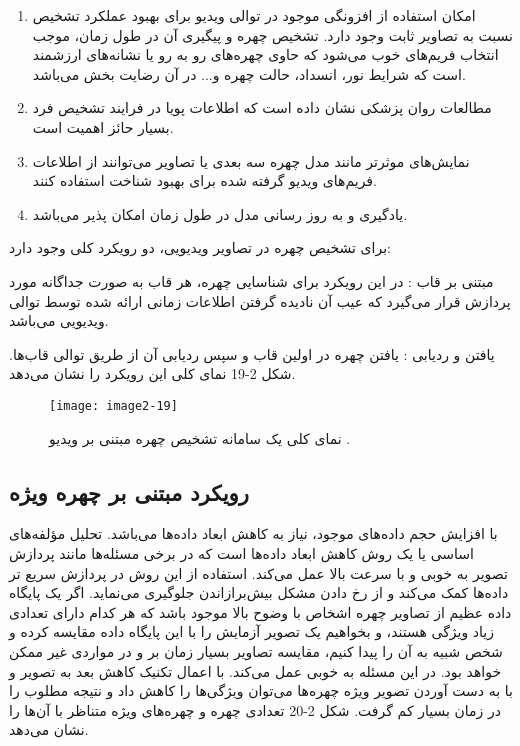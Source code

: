 \begin{enumerate}
\item
	امکان استفاده از افزونگی موجود در توالی ویدیو برای بهبود عملکرد تشخیص نسبت به تصاویر ثابت وجود دارد. تشخیص چهره و پیگیری آن در طول زمان، موجب انتخاب فریم‌های خوب می‌شود که حاوی چهره‌های رو به رو یا نشانه‌های ارزشمند است که شرایط نور، انسداد، حالت چهره و... در آن رضایت بخش می‌باشد.
\item 
	مطالعات روان پزشکی نشان داده است که اطلاعات پویا در فرایند تشخیص فرد بسیار حائز اهمیت است. 
\item
	نمایش‌های موثرتر مانند مدل چهره سه بعدی یا تصاویر  می‌توانند از اطلاعات فریم‌های ویدیو گرفته شده برای بهبود شناخت استفاده کنند.
\item
	یادگیری و به روز رسانی مدل در طول زمان امکان پذیر می‌باشد.
\end{enumerate}
	
\noindent
برای تشخیص چهره در تصاویر ویدیویی، دو رویکرد کلی وجود دارد:

\noindent
مبتنی بر قاب : در این رویکرد برای شناسایی چهره، هر قاب به صورت جداگانه مورد پردازش قرار می‌گیرد که عیب آن نادیده گرفتن اطلاعات زمانی ارائه شده توسط توالی ویدیویی می‌باشد. 

\noindent
یافتن و ردیابی : یافتن چهره در اولین قاب و سپس ردیابی آن از طریق توالی قاب‌ها. شکل 2-19 نمای کلی این رویکرد را نشان می‌دهد.
 
 \begin{figure}[h]
\centering
  \texttt{[image: image2-19]}
  \caption{نمای کلی یک سامانه تشخیص چهره مبتنی بر ویدیو \cite{ref1}.}
  \label{image2-19}
\end{figure}

 \subsection{رویکرد مبتنی بر چهره ویژه}
با افزایش حجم داده‌های موجود، نیاز به کاهش ابعاد داده‌ها می‌باشد. تحلیل مؤلفه‌های اساسی یا   یک روش‌ کاهش ابعاد داده‌ها است که در برخی مسئله‌ها مانند پردازش تصویر به خوبی و با سرعت بالا عمل می‌کند. استفاده از این روش در پردازش سریع تر داده‌ها کمک می‌کند و از رخ دادن مشکل بیش‌برازاندن  جلوگیری می‌نماید. اگر یک پایگاه داده عظیم از تصاویر چهره اشخاص با وضوح بالا موجود باشد که هر کدام دارای تعدادی زیاد ویژگی هستند، و بخواهیم یک تصویر آزمایش را با این پایگاه داده مقایسه کرده و شخص شبیه به آن را پیدا کنیم، مقایسه تصاویر بسیار زمان بر و در مواردی غیر ممکن خواهد بود.  در این مسئله به خوبی عمل می‌کند. با اعمال تکنیک کاهش بعد به تصویر و با به دست آوردن تصویر ویژه چهره‌ها  می‌توان ویژگی‌ها را کاهش داد و نتیجه مطلوب را در زمان بسیار کم گرفت. شکل 2-20 تعدادی چهره و چهره‌های ویژه متناظر با آن‌ها را نشان می‌دهد.


